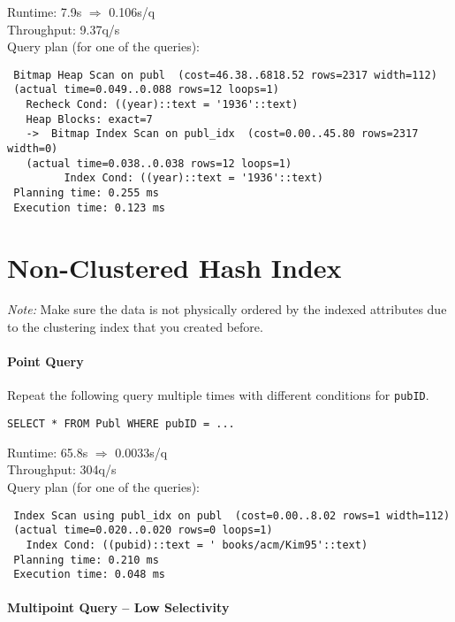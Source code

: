 \documentclass[11pt]{scrartcl}
\begin{document}
\smallskip\noindent
Runtime: 7.9s $\Rightarrow$ 0.106s/q\\
Throughput: 9.37q/s\\

\smallskip\noindent
Query plan (for one of the queries):
{\small
\begin{verbatim}
 Bitmap Heap Scan on publ  (cost=46.38..6818.52 rows=2317 width=112)
 (actual time=0.049..0.088 rows=12 loops=1)
   Recheck Cond: ((year)::text = '1936'::text)
   Heap Blocks: exact=7
   ->  Bitmap Index Scan on publ_idx  (cost=0.00..45.80 rows=2317 width=0)
   (actual time=0.038..0.038 rows=12 loops=1)
         Index Cond: ((year)::text = '1936'::text)
 Planning time: 0.255 ms
 Execution time: 0.123 ms

\end{verbatim}
}

\section{Non-Clustered Hash Index}

\noindent \emph{Note:} Make sure the data is not physically ordered by
the indexed attributes due to the clustering index that you created
before.

\paragraph{Point Query}

Repeat the following query multiple times with different conditions for {\tt pubID}.

{\small
\begin{verbatim}
SELECT * FROM Publ WHERE pubID = ...
\end{verbatim}
}

\noindent
\condA

\smallskip\noindent
Runtime: 65.8s $\Rightarrow$ 0.0033s/q\\
Throughput: 304q/s\\

\smallskip\noindent
Query plan (for one of the queries):
{\small
\begin{verbatim}
 Index Scan using publ_idx on publ  (cost=0.00..8.02 rows=1 width=112)
 (actual time=0.020..0.020 rows=0 loops=1)
   Index Cond: ((pubid)::text = ' books/acm/Kim95'::text)
 Planning time: 0.210 ms
 Execution time: 0.048 ms
\end{verbatim}
}


\paragraph{Multipoint Query -- Low Selectivity}
\end{document}
